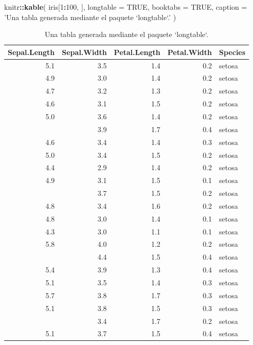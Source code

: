 \documentclass[12pt,]{krantz}
\makeatletter
\newenvironment{Shaded}{\begin{snugshade}}{\end{snugshade}}
\newcommand{\KeywordTok}[1]{\textcolor[rgb]{0.13,0.29,0.53}{\textbf{#1}}}
\newcommand{\DataTypeTok}[1]{\textcolor[rgb]{0.13,0.29,0.53}{#1}}
\newcommand{\DecValTok}[1]{\textcolor[rgb]{0.00,0.00,0.81}{#1}}
\newcommand{\StringTok}[1]{\textcolor[rgb]{0.31,0.60,0.02}{#1}}
\newcommand{\OtherTok}[1]{\textcolor[rgb]{0.56,0.35,0.01}{#1}}
\newcommand{\OperatorTok}[1]{\textcolor[rgb]{0.81,0.36,0.00}{\textbf{#1}}}
\newcommand{\NormalTok}[1]{#1}
\newenvironment{kframe}{%
\medskip{}
\setlength{\fboxsep}{.8em}
 \def\at@end@of@kframe{}%
 \ifinner\ifhmode%
  \def\at@end@of@kframe{\end{minipage}}%
  \begin{minipage}{\columnwidth}%
 \fi\fi%
 \def\FrameCommand##1{\hskip\@totalleftmargin \hskip-\fboxsep
 \colorbox{shadecolor}{##1}\hskip-\fboxsep
     \hskip-\linewidth \hskip-\@totalleftmargin \hskip\columnwidth}%
 \MakeFramed {\advance\hsize-\width
   \@totalleftmargin\z@ \linewidth\hsize
   \@setminipage}}%
 {\par\unskip\endMakeFramed%
 \at@end@of@kframe}
\renewenvironment{Shaded}{\begin{kframe}}{\end{kframe}}
\theoremstyle{definition}
\theoremstyle{definition}
\theoremstyle{definition}
\theoremstyle{remark}
\makeatother
\begin{document}
\begin{Shaded}
\begin{Highlighting}[]
\NormalTok{knitr}\OperatorTok{::}\KeywordTok{kable}\NormalTok{(}
\NormalTok{  iris[}\DecValTok{1}\OperatorTok{:}\DecValTok{100}\NormalTok{, ], }\DataTypeTok{longtable =} \OtherTok{TRUE}\NormalTok{, }\DataTypeTok{booktabs =} \OtherTok{TRUE}\NormalTok{,}
  \DataTypeTok{caption =} \StringTok{'Una tabla generada mediante el paquete `longtable`.'}
\NormalTok{)}
\end{Highlighting}
\end{Shaded}

\begin{longtable}[t]{rrrrl}
\caption{\label{tab:longtable}Una tabla generada mediante el paquete `longtable`.}\\
\toprule
Sepal.Length & Sepal.Width & Petal.Length & Petal.Width & Species\\
\midrule
5.1 & 3.5 & 1.4 & 0.2 & setosa\\
4.9 & 3.0 & 1.4 & 0.2 & setosa\\
4.7 & 3.2 & 1.3 & 0.2 & setosa\\
4.6 & 3.1 & 1.5 & 0.2 & setosa\\
5.0 & 3.6 & 1.4 & 0.2 & setosa\\
\addlinespace
5.4 & 3.9 & 1.7 & 0.4 & setosa\\
4.6 & 3.4 & 1.4 & 0.3 & setosa\\
5.0 & 3.4 & 1.5 & 0.2 & setosa\\
4.4 & 2.9 & 1.4 & 0.2 & setosa\\
4.9 & 3.1 & 1.5 & 0.1 & setosa\\
\addlinespace
5.4 & 3.7 & 1.5 & 0.2 & setosa\\
4.8 & 3.4 & 1.6 & 0.2 & setosa\\
4.8 & 3.0 & 1.4 & 0.1 & setosa\\
4.3 & 3.0 & 1.1 & 0.1 & setosa\\
5.8 & 4.0 & 1.2 & 0.2 & setosa\\
\addlinespace
5.7 & 4.4 & 1.5 & 0.4 & setosa\\
5.4 & 3.9 & 1.3 & 0.4 & setosa\\
5.1 & 3.5 & 1.4 & 0.3 & setosa\\
5.7 & 3.8 & 1.7 & 0.3 & setosa\\
5.1 & 3.8 & 1.5 & 0.3 & setosa\\
\addlinespace
5.4 & 3.4 & 1.7 & 0.2 & setosa\\
5.1 & 3.7 & 1.5 & 0.4 & setosa\\

\end{longtable}
\end{document}

